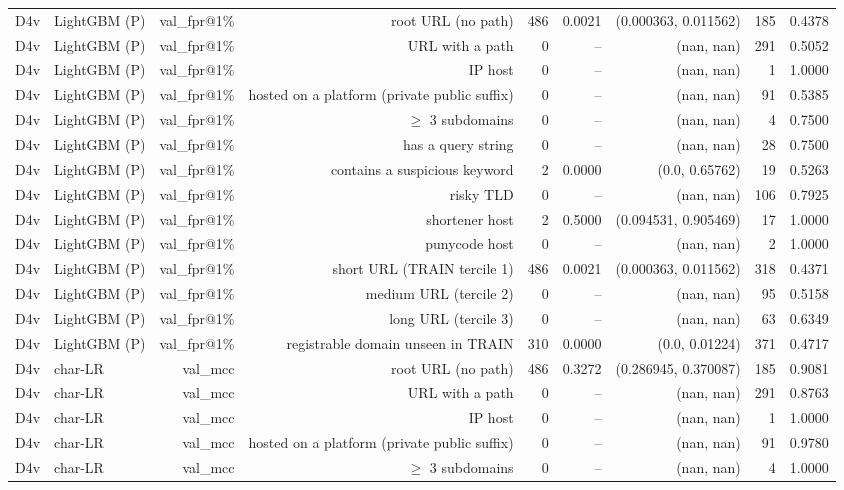 \begin{table}[t]
\begin{tabular}{llrrrrrrr}
D4v & LightGBM (P) & val\_fpr@1\% & root URL (no path) & 486 & 0.0021 & (0.000363, 0.011562) & 185 & 0.4378 \\
D4v & LightGBM (P) & val\_fpr@1\% & URL with a path & 0 & -- & (nan, nan) & 291 & 0.5052 \\
D4v & LightGBM (P) & val\_fpr@1\% & IP host & 0 & -- & (nan, nan) & 1 & 1.0000 \\
D4v & LightGBM (P) & val\_fpr@1\% & hosted on a platform (private public suffix) & 0 & -- & (nan, nan) & 91 & 0.5385 \\
D4v & LightGBM (P) & val\_fpr@1\% & $\geq$ 3 subdomains & 0 & -- & (nan, nan) & 4 & 0.7500 \\
D4v & LightGBM (P) & val\_fpr@1\% & has a query string & 0 & -- & (nan, nan) & 28 & 0.7500 \\
D4v & LightGBM (P) & val\_fpr@1\% & contains a suspicious keyword & 2 & 0.0000 & (0.0, 0.65762) & 19 & 0.5263 \\
D4v & LightGBM (P) & val\_fpr@1\% & risky TLD & 0 & -- & (nan, nan) & 106 & 0.7925 \\
D4v & LightGBM (P) & val\_fpr@1\% & shortener host & 2 & 0.5000 & (0.094531, 0.905469) & 17 & 1.0000 \\
D4v & LightGBM (P) & val\_fpr@1\% & punycode host & 0 & -- & (nan, nan) & 2 & 1.0000 \\
D4v & LightGBM (P) & val\_fpr@1\% & short URL (TRAIN tercile 1) & 486 & 0.0021 & (0.000363, 0.011562) & 318 & 0.4371 \\
D4v & LightGBM (P) & val\_fpr@1\% & medium URL (tercile 2) & 0 & -- & (nan, nan) & 95 & 0.5158 \\
D4v & LightGBM (P) & val\_fpr@1\% & long URL (tercile 3) & 0 & -- & (nan, nan) & 63 & 0.6349 \\
D4v & LightGBM (P) & val\_fpr@1\% & registrable domain unseen in TRAIN & 310 & 0.0000 & (0.0, 0.01224) & 371 & 0.4717 \\
D4v & char-LR & val\_mcc & root URL (no path) & 486 & 0.3272 & (0.286945, 0.370087) & 185 & 0.9081 \\
D4v & char-LR & val\_mcc & URL with a path & 0 & -- & (nan, nan) & 291 & 0.8763 \\
D4v & char-LR & val\_mcc & IP host & 0 & -- & (nan, nan) & 1 & 1.0000 \\
D4v & char-LR & val\_mcc & hosted on a platform (private public suffix) & 0 & -- & (nan, nan) & 91 & 0.9780 \\
D4v & char-LR & val\_mcc & $\geq$ 3 subdomains & 0 & -- & (nan, nan) & 4 & 1.0000 \\

\end{tabular}
\end{table}
